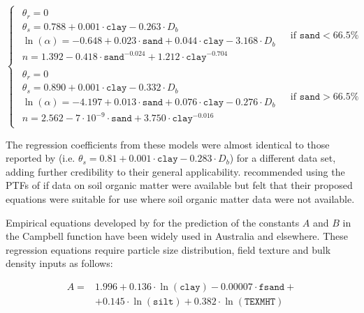 \documentclass[11pt]{krantz}
\theoremstyle{definition}
\theoremstyle{definition}
\theoremstyle{definition}
\theoremstyle{remark}
\begin{document}
\begin{equation}
\begin{cases}
 \begin{matrix}
 \theta_r  = 0 \\
 \theta_s  = 0.788 + 0.001 \cdot {\mathtt{clay}} -0.263 \cdot D_b \\
 \ln(\alpha) = -0.648 + 0.023 \cdot {\mathtt{sand}} + 0.044 \cdot {\mathtt{clay}} -3.168 \cdot D_b \\
 n = 1.392- 0.418\cdot {\mathtt{sand}}^{-0.024} + 1.212\cdot {\mathtt{clay}}^{-0.704}
\end{matrix} & \text{ if } {\mathtt{sand}} < 66.5\% \\ \hline \begin{matrix}
 \theta_r  = 0 \\
 \theta_s  = 0.890 + 0.001 \cdot {\mathtt{clay}} -0.332 \cdot D_b \\
 \ln(\alpha) = -4.197 + 0.013 \cdot {\mathtt{sand}} + 0.076 \cdot {\mathtt{clay}} -0.276 \cdot D_b \\
 n = 2.562 - 7 \cdot 10^{-9} \cdot {\mathtt{sand}} + 3.750\cdot {\mathtt{clay}}^{-0.016}
\end{matrix} & \text{ if } {\mathtt{sand}} > 66.5\%
\end{cases}
\label{eq:thetas}
\end{equation}

The regression coefficients from these models were almost identical to
those reported by \citet{Vereecken1989SS} (i.e.
\(\theta_s = 0.81 + 0.001 \cdot {\mathtt{clay}} - 0.283 \cdot D_b\)) for
a different data set, adding further credibility to their general
applicability. \citet{Zacharias2007SSSAJ} recommended using the PTFs of
\citet{Vereecken1989SS} if data on soil organic matter were available
but felt that their proposed equations were suitable for use where soil
organic matter data were not available.

Empirical equations developed by \citet{Williams1992} for the prediction
of the constants \(A\) and \(B\) in the Campbell function have been
widely used in Australia and elsewhere. These regression equations
require particle size distribution, field texture and bulk density
inputs as follows:

\begin{equation}
\begin{split}   
A =& 1.996 + 0.136 \cdot \ln({\mathtt{clay}}) - 0.00007 \cdot {\mathtt{fsand}} + \\
  & + 0.145\cdot \ln({\mathtt{silt}}) + 0.382 \cdot \ln({\mathtt{TEXMHT}})
\end{split}
\end{equation}
\end{document}
